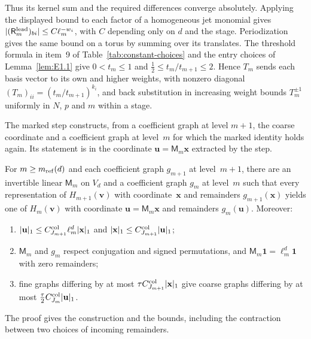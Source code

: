 Thus its kernel sum and the required differences converge absolutely. Applying the displayed bound to each factor of a homogeneous jet monomial gives $|(\mathsf R^{\rm lead}_m)_{bi}|\le C\ell_m^{-w_i}$, with $C$ depending only on $d$ and the stage. Periodization gives the same bound on a torus by summing over its translates. The threshold formula in item~9 of Table~\ref{tab:constant-choices} and the entry choices of Lemma~\ref{lem:E1.1} give $0<t_m\le1$ and $\tfrac12\le t_m/t_{m+1}\le2$. Hence $T_m$ sends each basis vector to its own and higher weights, with nonzero diagonal $(T_m)_{ii}=(t_m/t_{m+1})^{k_i}$, and back substitution in increasing weight bounds $T_m^{\pm1}$ uniformly in $N$, $p$ and $m$ within a stage.

The marked step constructs, from a coefficient graph at level $m+1$, the coarse coordinate and a coefficient graph at level~$m$ for which the marked identity holds again. Its statement is in the coordinate $\mathbf u=\mathsf M_m\mathbf x$ extracted by the step.
\begin{lemma}\label{lem:E-marked-step}
For $m\ge m_{\mathrm{ref}}(d)$ and each coefficient graph $g_{m+1}$ at level~$m+1$, there are an invertible linear $\mathsf M_m$ on $V_d$ and a coefficient graph $g_m$ at level~$m$ such that every representation of $H_{m+1}(\mathbf v)$ with coordinate~$\mathbf x$ and remainders $g_{m+1}(\mathbf x)$ yields one of $H_m(\mathbf v)$ with coordinate $\mathbf u=\mathsf M_m\mathbf x$ and remainders $g_m(\mathbf u)$. Moreover:
\begin{enumerate}
\item[(i)] $|\mathbf u|_1\le C^{\rm col}_{J_{m+1}}\ell_m^d|\mathbf x|_1$ and $|\mathbf x|_1\le C^{\rm col}_{J_{m+1}}|\mathbf u|_1$;
\item[(ii)] $\mathsf M_m$ and $g_m$ respect conjugation and signed permutations, and $\mathsf M_m\mathbf1=\ell_m^d\mathbf1$ with zero remainders;
\item[(iii)] fine graphs differing by at most $\tau C^{\rm col}_{J_{m+1}}|\mathbf x|_1$ give coarse graphs differing by at most $\tfrac\tau2C^{\rm col}_{J_m}|\mathbf u|_1$.
\end{enumerate}
\end{lemma}
The proof gives the construction and the bounds, including the contraction between two choices of incoming remainders.
